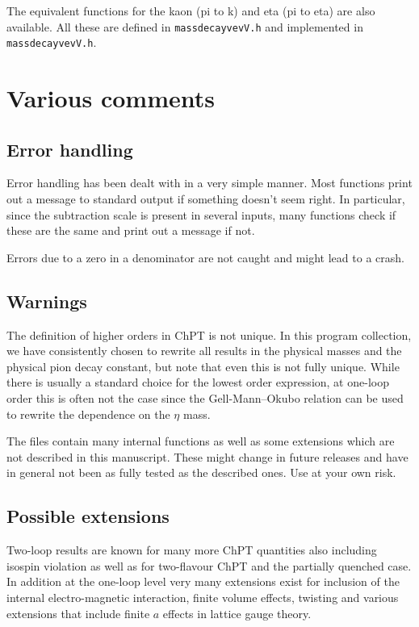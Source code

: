\documentclass[12pt,a4paper]{article}
\begin{document}
The equivalent functions for the kaon (pi to k) and eta (pi to eta)
are also available. All these are defined in \texttt{massdecayvevV.h}
and implemented in \texttt{massdecayvevV.h}.

\section{Various comments}
\label{various}

\subsection{Error handling}

Error handling has been dealt with in a very simple manner. Most functions
print out a message to standard output if something doesn't seem right.
In particular, since the subtraction scale is present in several
inputs, many functions check if these are the same and print out a message
if not.

Errors due to a zero in a denominator are not caught and might lead to a
crash.

\subsection{Warnings}

The definition of higher orders in ChPT is not unique. In this
program collection, we have consistently chosen to rewrite all results
in the physical masses and the physical pion decay constant, but note that
even this is not fully unique. While there is usually a standard choice for the
lowest order expression, at one-loop order this is often not the case since
the Gell-Mann--Okubo relation can be used to rewrite the dependence on the
$\eta$ mass.

The files contain many internal functions as well as some extensions
which are not described in this manuscript. These might change in future
releases and have in general not been as fully tested as the described ones.
Use at your own risk.
 
\subsection{Possible extensions}


Two-loop results are known for many more
ChPT quantities also including isospin violation as well as for
two-flavour ChPT and the partially quenched case. In addition at the one-loop
level very many extensions exist for inclusion of the internal
electro-magnetic interaction, finite volume effects, twisting and various
extensions that include finite $a$ effects in lattice gauge theory.
\end{document}
